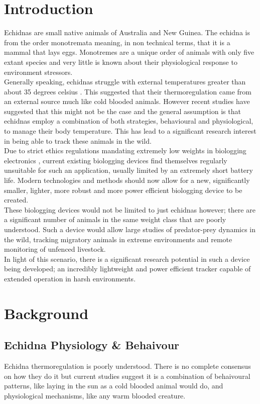 \documentclass[12pt,openany,a4paper]{book}
\begin{document}
\chapter{Introduction}
Echidnas are small native animals of Australia and New Guinea. The echidna is from the order monotremata meaning, in non technical terms, that it is a mammal that lays eggs. Monotremes are a unique order of animals with only five extant species and very little is known about their physiological response to environment stressors.\\ 

Generally speaking, echidnas struggle with external temperatures greater than about 35 degrees celsius \cite{Brice02}. This suggested that their thermoregulation came from an external source much like cold blooded animals. However recent studies have suggested that this might not be the case and the general assumption is that echidnas employ a combination of both strategies, behavioural and physiological, to manage their body temperature. This has lead to a significant research interest in being able to track these animals in the wild.\\

Due to strict ethics regulations mandating extremely low weights in biologging electronics \cite{Mamm87}, current existing biologging devices find themselves regularly unsuitable for such an application, usually limited by an extremely short battery life. Modern technologies and methods should now allow for a new, significantly smaller, lighter, more robust and more power efficient biologging device to be created. \\

These biologging devices would not be limited to just echidnas however; there are a significant number of animals in the same weight class that are poorly understood. Such a device would allow large studies of predator-prey dynamics in the wild, tracking migratory animals in extreme environments and remote monitoring of unfenced livestock. \\

In light of this scenario, there is a significant research potential in such a device being developed; an incredibly lightweight and power efficient tracker capable of extended operation in harsh environments.

\chapter{Background}
	\section{Echidna Physiology \& Behaivour}
	Echidna thermoregulation is poorly understood. There is no complete consensus on how they do it \cite{Brice02} but current studies suggest it is a combination of behaivoural patterns, like laying in the sun as a cold blooded animal would do, and physiological mechanisms, like any warm blooded creature.\\ 
	
\end{document}
